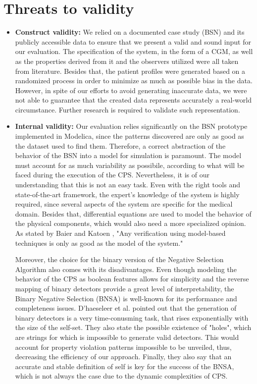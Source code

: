 \section{Threats to validity}

\begin{itemize}
    \item \textbf{Construct validity:} We relied on a documented case study  (BSN) and its publicly accessible data to ensure that we present a valid and sound input for our evaluation. The specification of the system, in the form of a CGM, as well as the properties derived from it and the observers utilized were all taken from literature. Besides that, the patient profiles were generated based on a randomized process in order to minimize as much as possible bias in the data. However, in spite of our efforts to avoid generating inaccurate data, we were not able to guarantee that the created data represents accurately a real-world circumstance. Further research is required to validate such representation.
    
    \item \textbf{Internal validity:} Our evaluation relies significantly on the BSN prototype implemented in Modelica, since the patterns discovered are only as good as the dataset used to find them. Therefore, a correct abstraction of the behavior of the BSN into a model for simulation is paramount. The model must account for as much variability as possibile, according to what will be faced during the execution of the CPS. Nevertheless, it is of our understanding that this is not an easy task. Even with the right tools and state-of-the-art framework, the expert's knowledge of the system is highly required, since several aspects of the system are specific for the medical domain. Besides that, differential equations are used to model the behavior of the physical components, which would also need a more specialized opinion. As stated by Baier and Katoen \cite{2008PrinciplesModelChecking}, "Any verification using model-based techniques is only as good as the model of the system."
    
    Moreover, the choice for the binary version of the Negative Selection Algorithm also comes with its disadivantages. Even though modeling the behavior of the CPS as boolean features allows for simplicity and the reverse mapping of binary detectors provide a great level of interpretability, the Binary Negative Selection (BNSA) is well-known for its performance and completeness issues. D'haeseleer et al. \cite{NSADetGen1996} pointed out that the generation of binary detectors is a very time-conusming task, that rises exponentially with the size of the self-set. They also state the possible existence of "holes", which are strings for which is impossible to generate valid detectors. This would account for property violation patterns impossible to be unveiled, thus, decreasing the efficiency of our approach. Finally, they also say that an accurate and stable definition of self is key for the success of the BNSA, which is not always the case due to the dynamic complexities of CPS.
	

\end{itemize}
